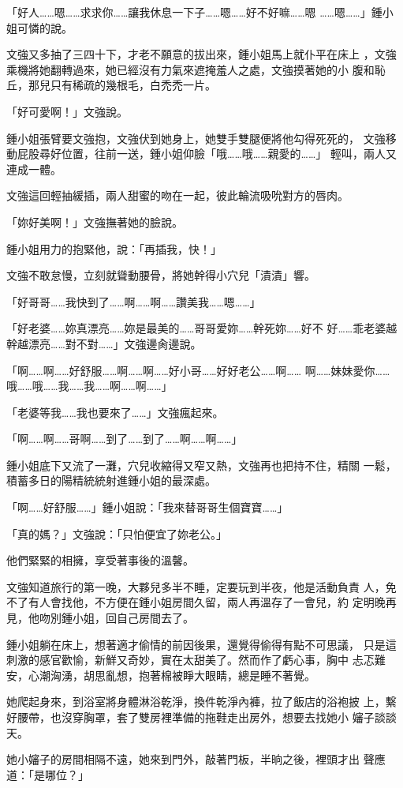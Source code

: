 「好人……嗯……求求你……讓我休息一下子……嗯……好不好嘛……嗯
……嗯……」鍾小姐可憐的說。

文強又多抽了三四十下，才老不願意的拔出來，鍾小姐馬上就仆平在床上
，文強乘機將她翻轉過來，她已經沒有力氣來遮掩羞人之處，文強摸著她的小
腹和恥丘，那兒只有稀疏的幾根毛，白禿禿一片。

「好可愛啊！」文強說。

鍾小姐張臂要文強抱，文強伏到她身上，她雙手雙腿便將他勾得死死的，
文強移動屁股尋好位置，往前一送，鍾小姐仰臉「哦……哦……親愛的……」
輕叫，兩人又連成一體。

文強這回輕抽緩插，兩人甜蜜的吻在一起，彼此輪流吸吮對方的唇肉。

「妳好美啊！」文強撫著她的臉說。

鍾小姐用力的抱緊他，說：「再插我，快！」

文強不敢怠慢，立刻就聳動腰骨，將她幹得小穴兒「漬漬」響。

「好哥哥……我快到了……啊……啊……讚美我……嗯……」

「好老婆……妳真漂亮……妳是最美的……哥哥愛妳……幹死妳……好不
好……乖老婆越幹越漂亮……對不對……」文強邊肏邊說。

「啊……啊……好舒服……啊……啊……好小哥……好好老公……啊……
啊……妹妹愛你……哦……哦……我……我……啊……啊……」

「老婆等我……我也要來了……」文強瘋起來。

「啊……啊……哥啊……到了……到了……啊……啊……」

鍾小姐底下又流了一灘，穴兒收縮得又窄又熱，文強再也把持不住，精關
一鬆，積蓄多日的陽精統統射進鍾小姐的最深處。

「啊……好舒服……」鍾小姐說：「我來替哥哥生個寶寶……」

「真的媽？」文強說：「只怕便宜了妳老公。」

他們緊緊的相擁，享受著事後的溫馨。

文強知道旅行的第一晚，大夥兒多半不睡，定要玩到半夜，他是活動負責
人，免不了有人會找他，不方便在鍾小姐房間久留，兩人再溫存了一會兒，約
定明晚再見，他吻別鍾小姐，回自己房間去了。

鍾小姐躺在床上，想著適才偷情的前因後果，還覺得偷得有點不可思議，
只是這刺激的感官歡愉，新鮮又奇妙，實在太甜美了。然而作了虧心事，胸中
忐忑難安，心潮洶湧，胡思亂想，抱著棉被睜大眼睛，總是睡不著覺。

她爬起身來，到浴室將身體淋浴乾淨，換件乾淨內褲，拉了飯店的浴袍披
上，繫好腰帶，也沒穿胸罩，套了雙房裡準備的拖鞋走出房外，想要去找她小
嬸子談談天。

她小嬸子的房間相隔不遠，她來到門外，敲著門板，半晌之後，裡頭才出
聲應道：「是哪位？」

